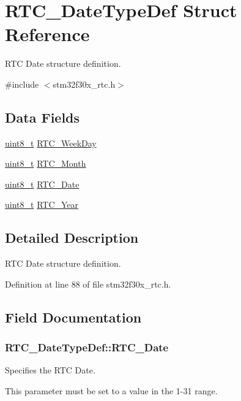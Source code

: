 \hypertarget{struct_r_t_c___date_type_def}{\section{R\-T\-C\-\_\-\-Date\-Type\-Def Struct Reference}
\label{struct_r_t_c___date_type_def}
}


R\-T\-C Date structure definition.  




{\ttfamily \#include $<$stm32f30x\-\_\-rtc.\-h$>$}

\subsection*{Data Fields}
\begin{DoxyCompactItemize}
\item 
\hyperlink{stdint_8h_aba7bc1797add20fe3efdf37ced1182c5}{uint8\-\_\-t} \hyperlink{struct_r_t_c___date_type_def_acaa2b3da6492190d7d9d12a9c6bb85a7}{R\-T\-C\-\_\-\-Week\-Day}
\item 
\hyperlink{stdint_8h_aba7bc1797add20fe3efdf37ced1182c5}{uint8\-\_\-t} \hyperlink{struct_r_t_c___date_type_def_accc373bea0b7e29cdaafbb67215299ad}{R\-T\-C\-\_\-\-Month}
\item 
\hyperlink{stdint_8h_aba7bc1797add20fe3efdf37ced1182c5}{uint8\-\_\-t} \hyperlink{struct_r_t_c___date_type_def_af6dbad7a3106b719d2dcd990694c4063}{R\-T\-C\-\_\-\-Date}
\item 
\hyperlink{stdint_8h_aba7bc1797add20fe3efdf37ced1182c5}{uint8\-\_\-t} \hyperlink{struct_r_t_c___date_type_def_a88d24df0c9b9c39fe4da76ec194272d3}{R\-T\-C\-\_\-\-Year}
\end{DoxyCompactItemize}


\subsection{Detailed Description}
R\-T\-C Date structure definition. 

Definition at line 88 of file stm32f30x\-\_\-rtc.\-h.



\subsection{Field Documentation}
\hypertarget{struct_r_t_c___date_type_def_af6dbad7a3106b719d2dcd990694c4063}{
\subsubsection[{R\-T\-C\-\_\-\-Date}]{ R\-T\-C\-\_\-\-Date\-Type\-Def\-::\-R\-T\-C\-\_\-\-Date}}\label{struct_r_t_c___date_type_def_af6dbad7a3106b719d2dcd990694c4063}
\begin{DoxyVerb}          Specifies the RTC Date.
\end{DoxyVerb}
 This parameter must be set to a value in the 1-\/31 range. 

